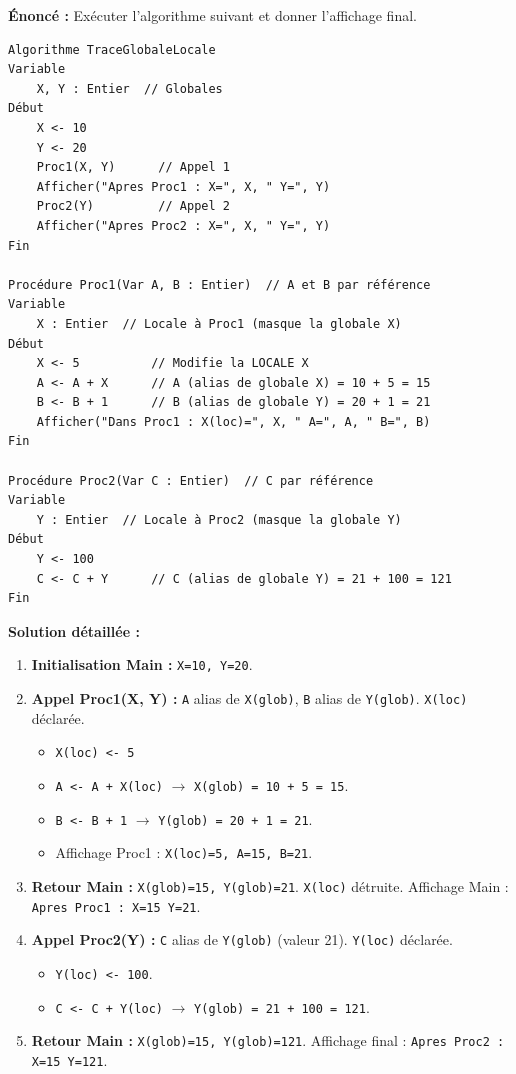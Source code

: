 \documentclass[11pt]{article}
\begin{document}
\begin{exoresolu}
\textbf{Énoncé :} Exécuter l'algorithme suivant et donner l'affichage final.
\begin{lstlisting}
Algorithme TraceGlobaleLocale
Variable
    X, Y : Entier  // Globales
Début
    X <- 10
    Y <- 20
    Proc1(X, Y)      // Appel 1
    Afficher("Apres Proc1 : X=", X, " Y=", Y)
    Proc2(Y)         // Appel 2
    Afficher("Apres Proc2 : X=", X, " Y=", Y)
Fin

Procédure Proc1(Var A, B : Entier)  // A et B par référence
Variable
    X : Entier  // Locale à Proc1 (masque la globale X)
Début
    X <- 5          // Modifie la LOCALE X
    A <- A + X      // A (alias de globale X) = 10 + 5 = 15
    B <- B + 1      // B (alias de globale Y) = 20 + 1 = 21
    Afficher("Dans Proc1 : X(loc)=", X, " A=", A, " B=", B)
Fin

Procédure Proc2(Var C : Entier)  // C par référence
Variable
    Y : Entier  // Locale à Proc2 (masque la globale Y)
Début
    Y <- 100
    C <- C + Y      // C (alias de globale Y) = 21 + 100 = 121
Fin
\end{lstlisting}

\textbf{Solution détaillée :}

\begin{enumerate}
    \item \textbf{Initialisation Main :} \texttt{X=10, Y=20}.
    \item \textbf{Appel Proc1(X, Y) :} \texttt{A} alias de \texttt{X(glob)}, \texttt{B} alias de \texttt{Y(glob)}. \texttt{X(loc)} déclarée.
        \begin{itemize}
            \item \texttt{X(loc) <- 5}
            \item \texttt{A <- A + X(loc)} $\rightarrow$ \texttt{X(glob) = 10 + 5 = 15}.
            \item \texttt{B <- B + 1} $\rightarrow$ \texttt{Y(glob) = 20 + 1 = 21}.
            \item Affichage Proc1 : \texttt{X(loc)=5, A=15, B=21}.
        \end{itemize}
    \item \textbf{Retour Main :} \texttt{X(glob)=15, Y(glob)=21}. \texttt{X(loc)} détruite.
        Affichage Main : \texttt{Apres Proc1 : X=15 Y=21}.
    \item \textbf{Appel Proc2(Y) :} \texttt{C} alias de \texttt{Y(glob)} (valeur 21). \texttt{Y(loc)} déclarée.
        \begin{itemize}
            \item \texttt{Y(loc) <- 100}.
            \item \texttt{C <- C + Y(loc)} $\rightarrow$ \texttt{Y(glob) = 21 + 100 = 121}.
        \end{itemize}
    \item \textbf{Retour Main :} \texttt{X(glob)=15, Y(glob)=121}.
        Affichage final : \texttt{Apres Proc2 : X=15 Y=121}.
\end{enumerate}


\end{exoresolu}
\end{document}
